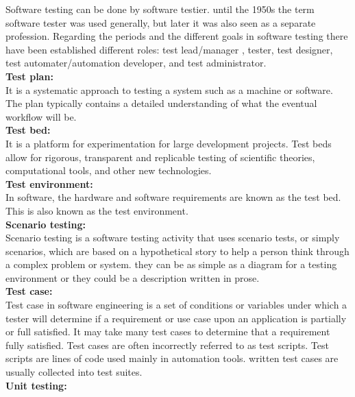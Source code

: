 \hspace*{0.82cm}Software testing can be done by software testier. until the 1950s the term software tester was used generally, 
but later it was also seen as a separate profession. Regarding the periods and the different goals in software testing there 
have been established different roles: test lead/manager , tester, test designer, test automater/automation developer, and test 
administrator.\\[0.5cm]
\textbf{Test plan:}\\
\hspace*{0.82cm}It is a systematic approach to testing a system such as a machine or software. The plan typically contains a detailed understanding of what the eventual
workflow will be.\\[0.5cm] 
\textbf{Test bed:}\\
\hspace*{0.82cm}It is a platform for experimentation for large development projects. Test beds allow for rigorous, transparent and 
replicable testing of scientific theories, computational tools, and other new technologies.\\[0.5cm]
\textbf{Test environment:}\\
\hspace*{0.82cm}In software, the hardware and software requirements are known as the test bed. This is also known as the test 
environment.\\[0.5cm]
\textbf{Scenario testing:}\\
\hspace*{0.82cm}Scenario testing is a software testing activity that uses scenario tests, or simply scenarios, which are based on 
a hypothetical story to help a person think through a complex problem or system. they can be as simple as a diagram for a testing 
environment or they could be a description written in prose.\\[0.5cm]
\textbf{Test case:}\\
\hspace*{0.82cm}Test case in software engineering is a set of conditions or variables under which a tester will determine if a 
requirement or use case upon an application is partially or full satisfied. It may take many test cases to determine that a 
requirement fully satisfied. Test cases are often incorrectly referred to as test scripts. Test scripts are lines of code used 
mainly in automation tools. written test cases are usually collected into test suites.\\[0.5cm]
\textbf{Unit testing:}\\
